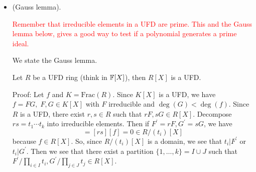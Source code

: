 \begin{itemize}
\begin{example}
    Now, since $\det$ is an irreducible homogeneous polynomial, the difference $\det-1$ must be irreducible. Therefore
    $I(SL_n\bbF) = (\det - 1)$ and we can compute the tangent space $T_I(SL_n)=V(d_I(\det))$. 
    We have 
    \begin{equation}
        \begin{split}
            d_I\det &= \sum_{k,\ell} D_{k\ell}(\det)(I)X_{k\ell}\\
                &= \sum_{k,\ell}\sum_{\sigma\in S_n}D_{k\ell}\prod_{i=1}^nX_{i\sigma(i)}(I) X_{k\ell}\\
                &= \sum_{k,\ell}\sum_{\sigma\in S_n}\delta_{\ell,\sigma(k)}
                \prod_{i\neq k}\delta_{i,\sigma(i)} X_{k\ell}\\
                &= \sum_{k,\ell}\delta_{k\ell} X_{k\ell}\quad
                (\delta_{\ell,\sigma(k)}
                \prod_{i\neq k}\delta_{i,\sigma(i)}\neq0\;\text{only if }\sigma=1)\\
                &=\sum_k X_{kk}.
        \end{split}
    \end{equation}
    Therefore $T_ISL_n(\bbF) = \fr{sl}_n\bbF$, the Lie algebra of traceless matrices.
  \end{example}
  \item(Gauss lemma).
  \begin{remark}
    \textcolor{red}{Remember that irreducible elements in a UFD are prime. This and the Gauss lemma below, gives a good 
    way to test if a polynomial generates a prime ideal.}
  \end{remark}
  We state the Gauss lemma.
  \begin{lemma}
    Let $R$ be a UFD ring (think in $\mathbb{F}[X]$), then $R[X]$ is a UFD.
  \end{lemma} 
  Proof: Let $f$ and $K=\text{Frac}(R)$. Since $K[X]$ is a UFD, we have 
  $f = FG,\;F,G\in K[X]$ with $F$ irreducible and $\deg(G)<\deg(f)$. Since $R$ is a UFD, there exist 
  $r,s\in R$ such that $rF,sG\in R[X]$. Decompose $rs = t_1\cdots t_k$ into irreducible elements. 
  Then if $F^\prime=rF, G^\prime=sG$, we have 
  \begin{equation}
    [F^\prime][G^\prime] = [rs][f] = 0 \in R/(t_i)[X]
  \end{equation}
  because $f\in R[X]$. So, since $R/(t_i)[X]$ is a domain, we see that $t_i|F^\prime$ or $t_i|G^\prime$. Then we see that 
  there exist a partition $\{1,\dots, k\}=I\cup J$ such that $F^\prime/\prod_{i\in I}t_i, G^\prime/\prod_{j\in J}t_j\in R[X]$.

\end{itemize}
